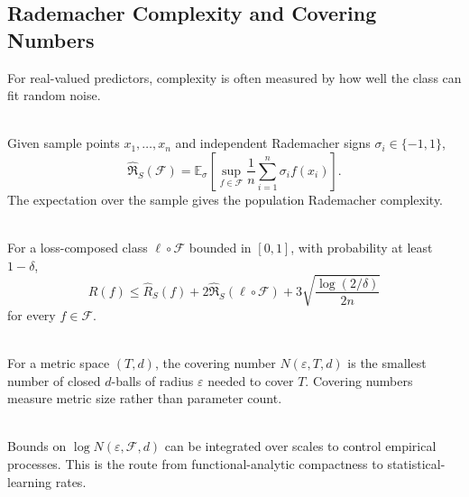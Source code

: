 \subsection{Rademacher Complexity and Covering Numbers}

For real-valued predictors, complexity is often measured by how well the class can fit random noise.

\begin{definition} \label{def:sl-rademacher-complexity} \\
Given sample points $x_1,\ldots,x_n$ and independent Rademacher signs $\sigma_i\in\{-1,1\}$,
\[
\widehat{\mathfrak{R}}_S(\mathcal{F})
=
\mathbb{E}_{\sigma}
\left[\sup_{f\in\mathcal{F}}\frac1n\sum_{i=1}^n\sigma_if(x_i)\right].
\]
The expectation over the sample gives the population Rademacher complexity.
\end{definition}

\begin{theorem} \label{thm:sl-rademacher-generalization-bound} \\
For a loss-composed class $\ell\circ\mathcal{F}$ bounded in $[0,1]$, with probability at least $1-\delta$,
\[
R(f)\leq \widehat{R}_S(f)
+2\widehat{\mathfrak{R}}_S(\ell\circ\mathcal{F})
+3\sqrt{\frac{\log(2/\delta)}{2n}}
\]
for every $f\in\mathcal{F}$.
\end{theorem}

\begin{definition} \label{def:sl-covering-number} \\
For a metric space $(T,d)$, the covering number $N(\varepsilon,T,d)$ is the smallest number of closed $d$-balls of radius $\varepsilon$ needed to cover $T$.  Covering numbers measure metric size rather than parameter count.
\end{definition}

\begin{remark} \label{rem:sl-entropy-integrals} \\
Bounds on $\log N(\varepsilon,\mathcal{F},d)$ can be integrated over scales to control empirical processes.  This is the route from functional-analytic compactness to statistical-learning rates.
\end{remark}
